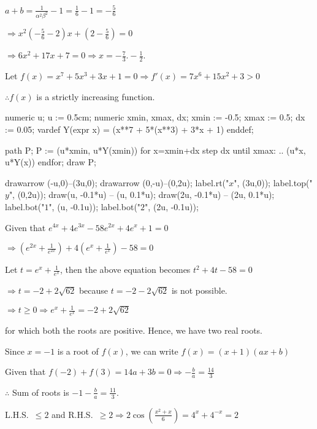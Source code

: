   $a + b = \frac{1}{\alpha^2\beta^2} - 1 = \frac{1}{6} - 1 = -\frac{5}{6}$

  $\Rightarrow x^2 \left(-\frac{5}{6} - 2\right)x + \left(2 - \frac{5}{6}\right) = 0$

  $\Rightarrow 6x^2 + 17x + 7 = 0\Rightarrow x = -\frac{7}{3}. -\frac{1}{2}$.
\item Let $f(x) = x^7 + 5x^3 + 3x + 1 = 0\Rightarrow f'(x) = 7x^6 + 15x^2 + 3 > 0$

  $\therefore f(x)$ is a strictly increasing function.

  \startplacefigure[location=force]
    \startMPcode
      numeric u; u := 0.5cm;     %
      numeric xmin, xmax, dx;
      xmin := -0.5; xmax := 0.5; dx := 0.05;
      vardef Y(expr x) = (x**7 + 5*(x**3) + 3*x + 1) enddef;

      path P;
      P := (u*xmin, u*Y(xmin))
      for x=xmin+dx step dx until xmax:
      .. (u*x, u*Y(x))
      endfor;
      draw P;

      drawarrow (-u,0)--(3u,0);
      drawarrow (0,-u)--(0,2u);
      label.rt("$x$", (3u,0));
      label.top("$y$", (0,2u));
      draw(u, -0.1*u) -- (u, 0.1*u);
      draw(2u, -0.1*u) -- (2u, 0.1*u);
      label.bot("$1$", (u, -0.1u));
      label.bot("$2$", (2u, -0.1u));
    \stopMPcode
  \stopplacefigure
\item Given that $e^{4x} + 4e^{3x} - 58e^{2x} + 4e^x + 1 = 0$

  $\Rightarrow \left(e^{2x} + \frac{1}{e^{2x}}\right) + 4\left(e^x + \frac{1}{e^x}\right) - 58 = 0$

  Let $t = e^x + \frac{1}{e^x}$, then the above equation becomes $t^2 + 4t - 58 = 0$

  $\Rightarrow t = -2 + 2\sqrt{62}$ because $t = -2 - 2\sqrt{62}$ is not possible.

  $\Rightarrow t \geq 0 \Rightarrow e^x + \frac{1}{e^x} = -2 + 2\sqrt{62}$

  for which both the roots are positive. Hence, we have two real roots.
\item Since $x = -1$ is a root of $f(x)$, we can write $f(x) = (x + 1)(ax + b)$

  Given that $f(-2) + f(3) = 14a + 3b = 0 \Rightarrow -\frac{b}{a} = \frac{14}{3}$

  $\therefore$ Sum of roots is $-1 - \frac{b}{a} = \frac{11}{3}$.
\item  L.H.S.\ $\leq 2$ and R.H.S.\ $\geq 2\Rightarrow 2\cos\left(\frac{x^2 + x}{6}\right) = 4^x + 4^{-x} =
  2$

